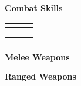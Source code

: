 \textbf{\large Combat Skills}\\
\begin{multicols}{2}
	\begin{tabular}{rlc}
		\rangedcombatskills
	\end{tabular}
	\par
	\columnbreak
	\begin{tabular}{rlc}
		\meleecombatskills
	\end{tabular}
\end{multicols}

\textbf{\large Melee Weapons}
\begin{multicols}{3}
\end{multicols}

\textbf{\large Ranged Weapons}
\begin{multicols}{3}
\end{multicols}
